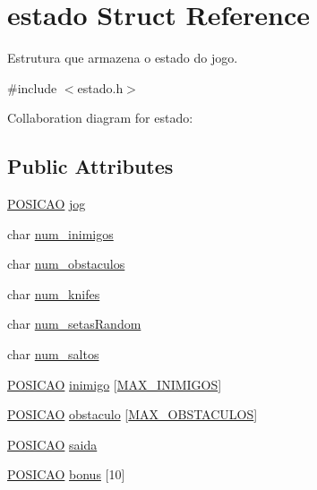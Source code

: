 \hypertarget{structestado}{\section{estado Struct Reference}
\label{structestado}
}


Estrutura que armazena o estado do jogo.  




{\ttfamily \#include $<$estado.\+h$>$}



Collaboration diagram for estado\+:
\subsection*{Public Attributes}
\begin{DoxyCompactItemize}
\item 
\hyperlink{estado_8h_a55b3f4b56938eeb8fa5e8f9c07baf1b0}{P\+O\+S\+I\+C\+A\+O} \hyperlink{structestado_abf55d0d40aafdd6829efbc8265b4f724}{jog}
\item 
char \hyperlink{structestado_a6fbc4a80c4f371036f264ecfe27e5f9e}{num\+\_\+inimigos}
\item 
char \hyperlink{structestado_ac1a8a541e2301189833c6f713c416063}{num\+\_\+obstaculos}
\item 
char \hyperlink{structestado_ad3c2d30fa4a26a98157482b44dc9c02a}{num\+\_\+knifes}
\item 
char \hyperlink{structestado_a132c56893325814012232e77277ec756}{num\+\_\+setas\+Random}
\item 
char \hyperlink{structestado_aba4d98f3c3002a7651b1c4a97230a9f7}{num\+\_\+saltos}
\item 
\hyperlink{estado_8h_a55b3f4b56938eeb8fa5e8f9c07baf1b0}{P\+O\+S\+I\+C\+A\+O} \hyperlink{structestado_a8f7d47deb337ae082beab6a574ace9e3}{inimigo} \mbox{[}\hyperlink{estado_8h_aa97e6cbfdd94711688f1176cb8dd916a}{M\+A\+X\+\_\+\+I\+N\+I\+M\+I\+G\+O\+S}\mbox{]}
\item 
\hyperlink{estado_8h_a55b3f4b56938eeb8fa5e8f9c07baf1b0}{P\+O\+S\+I\+C\+A\+O} \hyperlink{structestado_a970dc20c6687acb17c3f08c06edbed4f}{obstaculo} \mbox{[}\hyperlink{estado_8h_ac574e2817856ecc9a890d2d47cb9d783}{M\+A\+X\+\_\+\+O\+B\+S\+T\+A\+C\+U\+L\+O\+S}\mbox{]}
\item 
\hyperlink{estado_8h_a55b3f4b56938eeb8fa5e8f9c07baf1b0}{P\+O\+S\+I\+C\+A\+O} \hyperlink{structestado_aca05b4bb64bbb53c0dab2dc61971ed91}{saida}
\item 
\hyperlink{estado_8h_a55b3f4b56938eeb8fa5e8f9c07baf1b0}{P\+O\+S\+I\+C\+A\+O} \hyperlink{structestado_a32ca181e16a34d1aef6c9df4864370be}{bonus} \mbox{[}10\mbox{]}

\end{DoxyCompactItemize}
